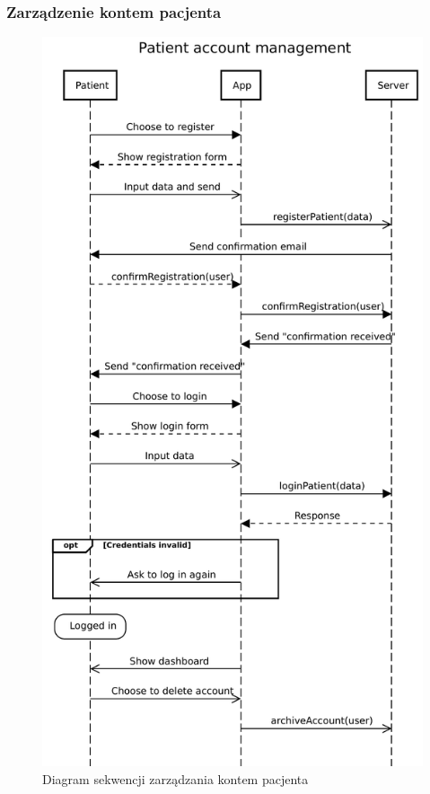 \documentclass[a4paper,12pt,polish]{article}
\begin{document}
\subsubsection{Zarządzenie kontem pacjenta}

\begin{figure}[!h]
    \centering
    \includegraphics[width=\textwidth,height=0.6\textheight,keepaspectratio]{Patient_account_management.pdf} 
    \caption{Diagram sekwencji zarządzania kontem pacjenta
    \label{fig:diagram-uml}}
\end{figure}
\end{document}
